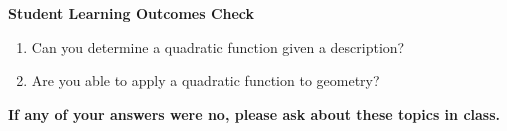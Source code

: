 \noindent \textbf{Student Learning Outcomes Check}

\begin{enumerate}
\item Can you determine a quadratic function given a description?
\item Are you able to apply a quadratic function to geometry?

\end{enumerate}

\noindent \textbf{If any of your answers were no, please ask about these topics in class.}


